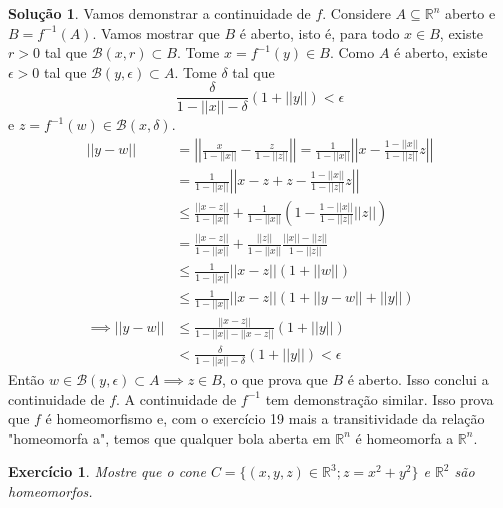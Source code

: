 \documentclass[a4paper,12pt]{article}
\newcommand{\R}{\mathbb{R}}
\newcommand{\B}{\mathcal{B}}
\theoremstyle{exer}
\newtheorem{exercise}{Exercício}
\theoremstyle{definition}
\newtheorem{solution}{Solução}
\theoremstyle{plain}
\begin{document}
\begin{solution}
    Vamos demonstrar a continuidade de $f$. 
    Considere $A \subseteq \R^n$ aberto e $B = f^{-1}(A)$. Vamos mostrar que
    $B$ é aberto, isto é, para todo $x \in B$,
    existe $r > 0$ tal que $\B(x, r) \subset B$. Tome $x = f^{-1}(y) \in B$.
    Como $A$ é aberto, existe $\epsilon > 0$ tal que $\B(y, \epsilon)
    \subset A$. Tome $\delta$ tal que 
    $$
    \frac{\delta}{1 - ||x|| - \delta}(1 + ||y||) < \epsilon
    $$
    e $z = f^{-1}(w) \in \B(x,\delta)$. 
    \begin{equation*}
        \begin{split}
            ||y - w|| &= \left|\left|\frac{x}{1 - ||x||} - \frac{z}{1 - ||z||}\right|\right| = \frac{1}{1 - ||x||}\left|\left|x - \frac{1 - ||x||}{1 - ||z||}z\right|\right| \\ 
            &= \frac{1}{1 - ||x||}\left|\left|x - z + z - \frac{1 - ||x||}{1 - ||z||}z\right|\right| \\
            &\le \frac{||x-z||}{1 - ||x||} + \frac{1}{1 - ||x||}\left(1 - \frac{1 - ||x||}{1 - ||z||}||z||\right) \\
            &= \frac{||x-z||}{1 - ||x||} + \frac{||z||}{1 - ||x||}\frac{||x|| - ||z||}{1 - ||z||} \\
            &\le \frac{1}{1 - ||x||}||x-z||(1 + ||w||) \\
            &\le \frac{1}{1 - ||x||}||x-z||(1 + ||y - w|| + ||y||) \\
            \implies ||y - w|| &\le \frac{||x-z||}{1 - ||x|| - ||x-z||}(1 + ||y||) \\ 
            &< \frac{\delta}{1 - ||x|| - \delta}(1 + ||y||) < \epsilon
        \end{split}
    \end{equation*}
    Então $w \in \B(y, \epsilon) \subset A \implies z \in B$, o que prova que
    $B$ é aberto. Isso conclui a continuidade de $f$. A continuidade de
    $f^{-1}$ tem demonstração similar. Isso prova que $f$ é homeomorfismo e,
    com o exercício 19 mais a transitividade da relação "homeomorfa a", temos
    que qualquer bola aberta em $\R^n$ é homeomorfa a $\R^n$. 
\end{solution}

\begin{exercise}
    Mostre que o cone $C = \{(x, y, z) \in \R^3 ; z = x^2 + y^2 \}$ e $\R^2$ são homeomorfos.
\end{exercise}
\end{document}

